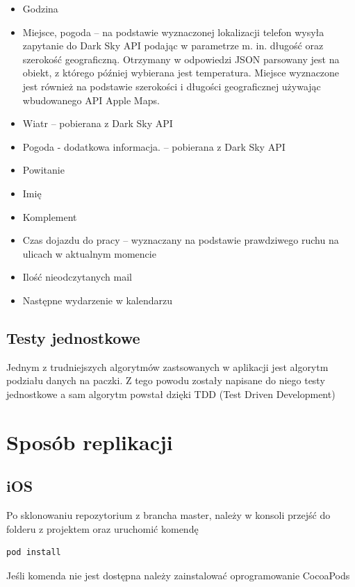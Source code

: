 \documentclass[a4paper,11pt]{article}
\begin{document}
\begin{itemize}
	\item Godzina
	\item Miejsce, pogoda -- na podstawie wyznaczonej lokalizacji telefon wysyła zapytanie do Dark Sky API podając w parametrze m. in. długość oraz szerokość geograficzną. Otrzymany w odpowiedzi JSON parsowany jest na obiekt, z którego później wybierana jest temperatura. Miejsce wyznaczone jest również na podstawie szerokości i długości geograficznej używając wbudowanego  API Apple Maps.
	\item Wiatr -- pobierana z Dark Sky API
	\item Pogoda - dodatkowa informacja. -- pobierana z Dark Sky API
	\item Powitanie
	\item Imię
	\item Komplement
	\item Czas dojazdu do pracy -- wyznaczany na podstawie prawdziwego ruchu na ulicach w aktualnym momencie
	\item Ilość nieodczytanych mail
	\item Następne wydarzenie w kalendarzu
	
\end{itemize}

\subsection{Testy jednostkowe}
Jednym z trudniejszych algorytmów zastsowanych w aplikacji jest algorytm podziału danych na paczki. Z tego powodu zostały napisane do niego testy jednostkowe a sam algorytm powstał dzięki TDD (Test Driven Development)

\section{Sposób replikacji}

\subsection{iOS}
Po sklonowaniu repozytorium z brancha master, należy w konsoli przejść do folderu z projektem oraz uruchomić komendę 
\begin{lstlisting}
pod install
\end{lstlisting}
Jeśli komenda nie jest dostępna należy zainstalować oprogramowanie CocoaPods
\end{document}

